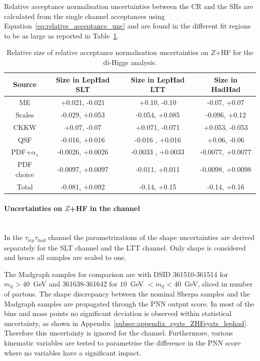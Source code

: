Relative acceptance normalisation uncertainties between the CR and the SRs are calculated 
from the single channel acceptances using Equation~\ref{eq:relative_acceptance_unc} 
and are found in the different fit regions to be 
as large as reported in Table~\ref{sec:systs:tab:systematics_normalisations_ZHF}.


\begin{table}
\centering
\small
\begin{tabular}{|c|c|c|c|}
\hline
Source & Size in LepHad SLT & Size in LepHad LTT & Size in HadHad\\
\hline
ME & +0.021, -0.021 & +0.10, -0.10 & -0.07, +0.07\\
Scales & -0.029, +0.053 & -0.054, +0.085 & -0.096, +0.12\\
CKKW & +0.07, -0.07 &  +0.071, -0.071 & +0.053, -0.053\\
QSF & -0.016, +0.016 & -0.016 , +0.016 & +0.06, -0.06 \\
PDF+$\alpha_s$ & -0.0026, +0.0026 & -0.0033 , +0.0033 & -0.0077, +0.0077 \\
PDF choice & -0.0097, +0.0097 & -0.011, +0.011 & -0.0098, +0.0098\\
Total & -0.081, +0.092 & -0.14, +0.15 & -0.14, +0.16\\
\hline
\end{tabular}
\caption{Relative size of relative acceptance normalisation uncertainties on $Z$+HF for the di-Higgs analysis.}
\label{sec:systs:tab:systematics_normalisations_ZHF}
\end{table}


\paragraph{Uncertainties on $Z$+HF in the \lephad channel}\mbox{}\\

In the $\tau_{lep}\tau_{had}$ channel the parametrizations of the shape uncertainties 
are derived separately for the SLT channel and the LTT channel. 
Only shape is considered and hence all samples are scaled to one.

The Madgraph samples for comparison are with DSID 361510-361514 for
$m_{ll} > 40$~GeV and 361638-361642 for $10$~GeV $< m_{ll} < 40$~GeV, 
sliced in number of partons. The shape discrepancy between the nominal Sherpa 
samples and the Madgraph samples are propagated through the PNN 
output score. In most of the bins and mass points 
no significant deviation is observed within statistical uncertainty, 
as shown in Appendix~\ref{subsec:appendix_systs_ZHFsysts_lephad}. 
Therefore this uncertainty is ignored for the \lephad channel. 
Furthermore, various kinematic variables are tested to parametrise
the difference in the PNN score where no variables have a significant impact. 


